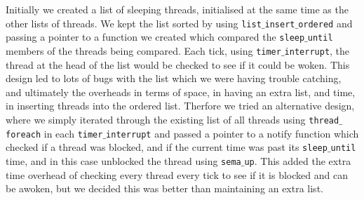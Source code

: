 \documentclass[a4paper,12pt]{article}
\begin{document}
Initially we created a list of sleeping threads, initialised at the same time as the other lists of threads. We kept the list sorted by using \texttt{list$\_$insert$\_$ordered} and passing a pointer to a function we created which compared the \texttt{sleep$\_$until} members of the threads being compared. Each tick, using \texttt{timer$\_$interrupt}, the thread at the head of the list would be checked to see if it could be woken. This design led to lots of bugs with the list which we were having trouble catching, and ultimately the overheads in terms of space, in having an extra list, and time, in inserting threads into the ordered list. Therfore we tried an alternative design, where we simply iterated through the existing list of all threads using \texttt{thread$\_$foreach} in each \texttt{timer$\_$interrupt} and passed a pointer to a notify function which checked if a thread was blocked, and if the current time was past its \texttt{sleep$\_$until} time, and in this case unblocked the thread using \texttt{sema$\_$up}. This added the extra time overhead of checking every thread every tick to see if it is blocked and can be awoken, but we decided this was better than maintaining an extra list.
\end{document}
